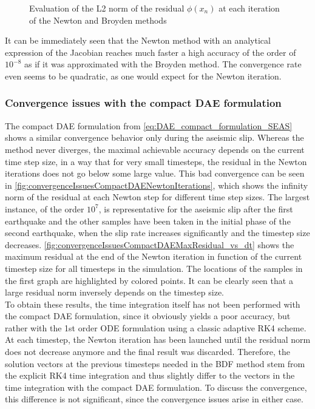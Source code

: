 \begin{figure}[H]
\begin{subfigure}{0.32\textwidth}
	\end{subfigure}
	\caption{Evaluation of the L2 norm of the residual $\phi(x_n)$ at each iteration of the Newton and Broyden methods}
	\label{fig:convergenceNewtonAndBroyden}
\end{figure}
It can be immediately seen that the Newton method with an analytical expression of the Jacobian reaches much faster a high accuracy of the order of $10^{-8}$ as if it was approximated with the Broyden method. The convergence rate even seems to be quadratic, as one would expect for the Newton iteration.

\subsubsection{Convergence issues with the compact DAE formulation}
The compact DAE formulation from \autoref{eq:DAE_compact_formulation_SEAS} shows a similar convergence behavior only during the aseismic slip. Whereas the method never diverges, the maximal achievable accuracy depends on the current time step size, in a way that for very small timesteps, the residual in the Newton iterations does not go below some large value. This bad convergence can be seen in \autoref{fig:convergenceIssuesCompactDAENewtonIterations}, which shows the infinity norm of the residual at each Newton step for different time step sizes. The largest instance, of the order $10^7$, is representative for the aseismic slip after the first earthquake and the other samples have been taken in the initial phase of the second earthquake, when the slip rate increases significantly and the timestep size decreases. \autoref{fig:convergenceIssuesCompactDAEMaxResidual_vs_dt} shows the maximum residual at the end of the Newton iteration in function of the current timestep size for all timesteps in the simulation. The locations of the samples in the first graph are highlighted by colored points. It can be clearly seen that a large residual norm inversely depends on the timestep size. \\ 
To obtain these results, the time integration itself has not been performed with the compact DAE formulation, since it obviously yields a poor accuracy, but rather with the 1st order ODE formulation using a classic adaptive RK4 scheme. At each timestep, the Newton iteration has been launched until the residual norm does not decrease anymore and the final result was discarded. Therefore, the solution vectors at the previous timesteps needed in the BDF method stem from the explicit RK4 time integration and thus slightly differ to the vectors in the time integration with the compact DAE formulation. To discuss the convergence, this difference is not significant, since the convergence issues arise in either case. \\

